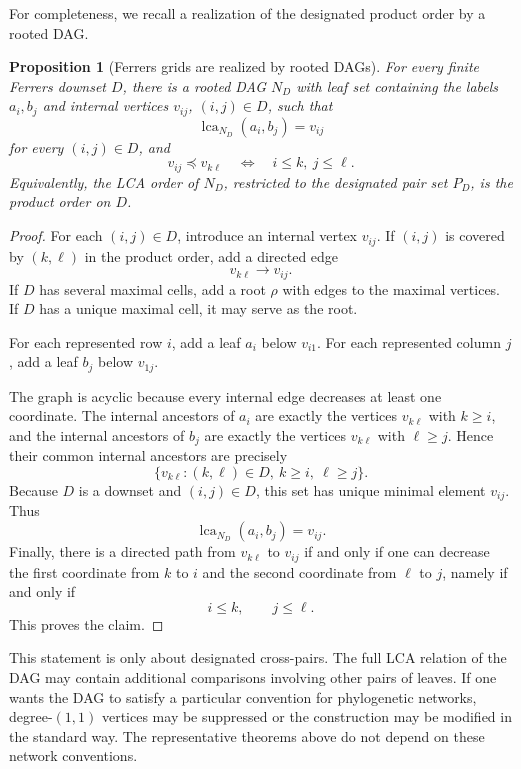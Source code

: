 \documentclass[11pt]{article}
\newtheorem{proposition}[theorem]{Proposition}
\begin{document}
For completeness, we recall a realization of the designated product order by a rooted DAG.

\begin{proposition}[Ferrers grids are realized by rooted DAGs]
For every finite Ferrers downset $D$, there is a rooted DAG $N_D$ with leaf set containing the labels $a_i,b_j$ and internal vertices $v_{ij}$, $(i,j)\in D$, such that
\[
\operatorname{lca}_{N_D}(a_i,b_j)=v_{ij}
\]
for every $(i,j)\in D$, and
\[
v_{ij}\preceq v_{k\ell}
\quad\Longleftrightarrow\quad
i\le k,\ j\le \ell.
\]
Equivalently, the LCA order of $N_D$, restricted to the designated pair set $P_D$, is the product order on $D$.
\end{proposition}

\begin{proof}
For each $(i,j)\in D$, introduce an internal vertex $v_{ij}$. If $(i,j)$ is covered by $(k,\ell)$ in the product order, add a directed edge
\[
v_{k\ell}\to v_{ij}.
\]
If $D$ has several maximal cells, add a root $\rho$ with edges to the maximal vertices. If $D$ has a unique maximal cell, it may serve as the root.

For each represented row $i$, add a leaf $a_i$ below $v_{i1}$. For each represented column $j$, add a leaf $b_j$ below $v_{1j}$.

The graph is acyclic because every internal edge decreases at least one coordinate. The internal ancestors of $a_i$ are exactly the vertices $v_{k\ell}$ with $k\ge i$, and the internal ancestors of $b_j$ are exactly the vertices $v_{k\ell}$ with $\ell\ge j$. Hence their common internal ancestors are precisely
\[
\{v_{k\ell}:(k,\ell)\in D,\ k\ge i,\ \ell\ge j\}.
\]
Because $D$ is a downset and $(i,j)\in D$, this set has unique minimal element $v_{ij}$. Thus
\[
\operatorname{lca}_{N_D}(a_i,b_j)=v_{ij}.
\]
Finally, there is a directed path from $v_{k\ell}$ to $v_{ij}$ if and only if one can decrease the first coordinate from $k$ to $i$ and the second coordinate from $\ell$ to $j$, namely if and only if
\[
i\le k,\qquad j\le \ell.
\]
This proves the claim.
\end{proof}

This statement is only about designated cross-pairs. The full LCA relation of the DAG may contain additional comparisons involving other pairs of leaves. If one wants the DAG to satisfy a particular convention for phylogenetic networks, degree-$(1,1)$ vertices may be suppressed or the construction may be modified in the standard way. The representative theorems above do not depend on these network conventions.
\end{document}
